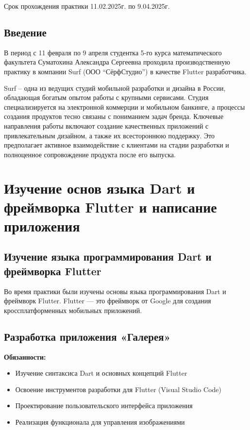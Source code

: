 \documentclass[a4paper, 12pt]{extarticle}
\begin{document}
Срок прохождения практики 11.02.2025г. по 9.04.2025г.
    
\subsection*{Введение}

В период с 11 февраля по 9 апреля студентка 5-го курса математического факультета Суматохина Александра Сергеевна проходила производственную практику в компании Surf (ООО “СёрфСтудио”) в качестве Flutter разработчика.

Surf – одна из ведущих студий мобильной разработки и дизайна в России, обладающая богатым опытом работы с крупными сервисами. Студия специализируется на электронной коммерции и мобильном банкинге, а процессы создания продуктов тесно связаны с пониманием задач бренда. Ключевые направления работы включают создание качественных приложений с привлекательным дизайном, а также их всестороннюю поддержку. Это предполагает активное взаимодействие с клиентами на стадии разработки и полноценное сопровождение продукта после его выпуска.

\section{Изучение основ языка Dart и фреймворка Flutter и написание приложения}
\subsection{Изучение языка программирования Dart и фреймворка Flutter}
Во время практики были изучены основы языка программирования Dart и фреймворк Flutter. Flutter — это фреймворк от Google для создания кроссплатформенных мобильных приложений.

\subsection{Разработка приложения «Галерея»}
\textbf{Обязанности:}
\begin{itemize}
    \item Изучение синтаксиса Dart и основных концепций Flutter
    \item Освоение инструментов разработки для Flutter (Visual Studio Code)
    \item Проектирование пользовательского интерфейса приложения
    \item Реализация функционала для управления изображениями
\end{itemize}
\end{document}
